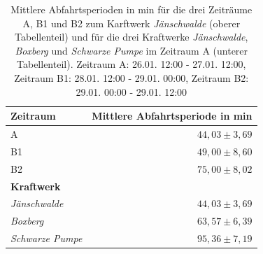 \begin{table}[!ht]
	\centering
	\caption{Mittlere Abfahrtsperioden in min für die drei Zeiträume A, B1 und B2 zum Karftwerk \emph{Jänschwalde} (oberer Tabellenteil) und für die drei Kraftwerke \emph{Jänschwalde}, \emph{Boxberg} und \emph{Schwarze Pumpe} im Zeitraum A (unterer Tabellenteil). Zeitraum A: 26.01. 12:00 - 27.01. 12:00, Zeitraum B1: 28.01. 12:00 - 29.01. 00:00, Zeitraum B2: 29.01. 00:00 - 29.01. 12:00}
	\label{tab:results}
	\begin{tabular}{|l|r|}
		\hline
		\textbf{Zeitraum} & \textbf{Mittlere Abfahrtsperiode in min} \\
		\hline
		\hline
		A & $44,03 \pm 3,69$\\
		\hline
		B1 & $49,00 \pm 8,60$\\
		\hline
        B2 & $75,00 \pm 8,02$\\
		\hline
		\hline
        \textbf{Kraftwerk} & \\
		\hline
		\hline
        \emph{Jänschwalde} & $44,03 \pm 3,69$\\
		\hline
        \emph{Boxberg} & $63,57 \pm 6,39$\\
		\hline
		\emph{Schwarze Pumpe} & $95,36 \pm 7,19$\\
		\hline
	\end{tabular}
\end{table}